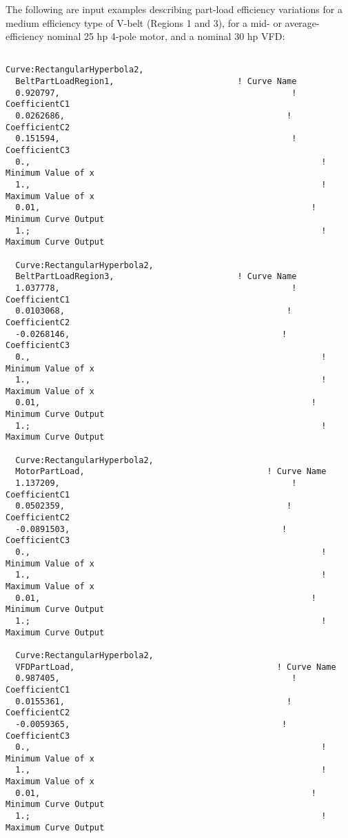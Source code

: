 The following are input examples describing part-load efficiency variations for a medium efficiency type of V-belt (Regions 1 and 3), for a mid- or average-efficiency nominal 25 hp 4-pole motor, and a nominal 30 hp VFD:

\begin{lstlisting}

Curve:RectangularHyperbola2,
  BeltPartLoadRegion1,                         ! Curve Name
  0.920797,                                               ! CoefficientC1
  0.0262686,                                             ! CoefficientC2
  0.151594,                                               ! CoefficientC3
  0.,                                                           ! Minimum Value of x
  1.,                                                           ! Maximum Value of x
  0.01,                                                       ! Minimum Curve Output
  1.;                                                           ! Maximum Curve Output

  Curve:RectangularHyperbola2,
  BeltPartLoadRegion3,                         ! Curve Name
  1.037778,                                               ! CoefficientC1
  0.0103068,                                             ! CoefficientC2
  -0.0268146,                                           ! CoefficientC3
  0.,                                                           ! Minimum Value of x
  1.,                                                           ! Maximum Value of x
  0.01,                                                       ! Minimum Curve Output
  1.;                                                           ! Maximum Curve Output

  Curve:RectangularHyperbola2,
  MotorPartLoad,                                     ! Curve Name
  1.137209,                                               ! CoefficientC1
  0.0502359,                                             ! CoefficientC2
  -0.0891503,                                           ! CoefficientC3
  0.,                                                           ! Minimum Value of x
  1.,                                                           ! Maximum Value of x
  0.01,                                                       ! Minimum Curve Output
  1.;                                                           ! Maximum Curve Output

  Curve:RectangularHyperbola2,
  VFDPartLoad,                                         ! Curve Name
  0.987405,                                               ! CoefficientC1
  0.0155361,                                             ! CoefficientC2
  -0.0059365,                                           ! CoefficientC3
  0.,                                                           ! Minimum Value of x
  1.,                                                           ! Maximum Value of x
  0.01,                                                       ! Minimum Curve Output
  1.;                                                           ! Maximum Curve Output
\end{lstlisting}


